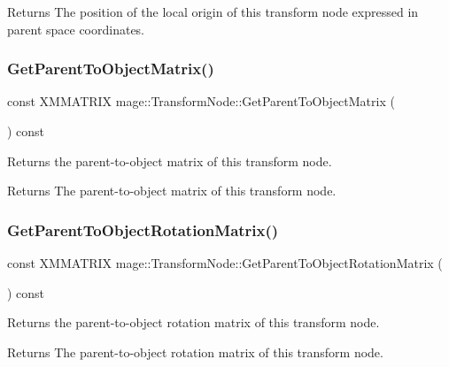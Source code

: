 \begin{DoxyReturn}{Returns}
The position of the local origin of this transform node expressed in parent space coordinates. 
\end{DoxyReturn}
\hypertarget{classmage_1_1_transform_node_afb6c8dba9ae69e19bed4400477c00e42}{}\label{classmage_1_1_transform_node_afb6c8dba9ae69e19bed4400477c00e42} 
\subsubsection{\texorpdfstring{Get\+Parent\+To\+Object\+Matrix()}{GetParentToObjectMatrix()}}
{\footnotesize\ttfamily const X\+M\+M\+A\+T\+R\+IX mage\+::\+Transform\+Node\+::\+Get\+Parent\+To\+Object\+Matrix (\begin{DoxyParamCaption}{ }\end{DoxyParamCaption}) const}

Returns the parent-\/to-\/object matrix of this transform node.

\begin{DoxyReturn}{Returns}
The parent-\/to-\/object matrix of this transform node. 
\end{DoxyReturn}
\hypertarget{classmage_1_1_transform_node_ad1dd1aa5ce60b32fe4481c072891fe95}{}\label{classmage_1_1_transform_node_ad1dd1aa5ce60b32fe4481c072891fe95} 
\subsubsection{\texorpdfstring{Get\+Parent\+To\+Object\+Rotation\+Matrix()}{GetParentToObjectRotationMatrix()}}
{\footnotesize\ttfamily const X\+M\+M\+A\+T\+R\+IX mage\+::\+Transform\+Node\+::\+Get\+Parent\+To\+Object\+Rotation\+Matrix (\begin{DoxyParamCaption}{ }\end{DoxyParamCaption}) const}

Returns the parent-\/to-\/object rotation matrix of this transform node.

\begin{DoxyReturn}{Returns}
The parent-\/to-\/object rotation matrix of this transform node. 
\end{DoxyReturn}
\hypertarget{classmage_1_1_transform_node_a99da2ec9e52fdfc1e9279f1e3fc2fc15}{}\label{classmage_1_1_transform_node_a99da2ec9e52fdfc1e9279f1e3fc2fc15} 
